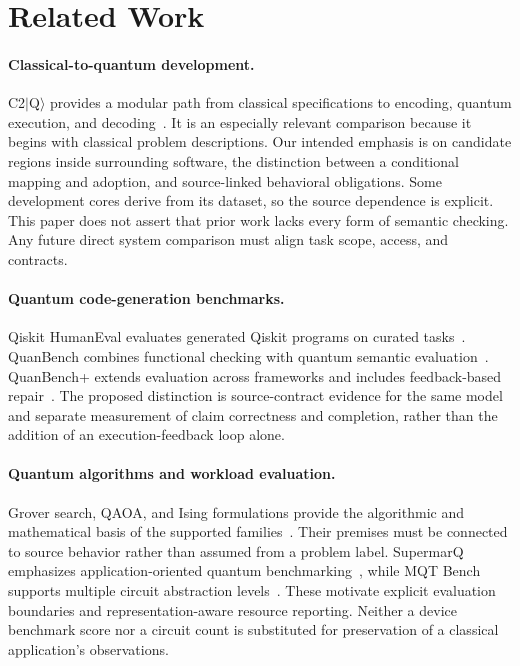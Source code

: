 \section{Related Work}
\paragraph{Classical-to-quantum development.}
C2$|$Q$\rangle$ provides a modular path from classical specifications to encoding,
quantum execution, and decoding~\cite{c2q}. It is an especially relevant comparison
because it begins with classical problem descriptions. Our intended emphasis is
on candidate regions inside surrounding software, the distinction between a
conditional mapping and adoption, and source-linked behavioral obligations. Some
development cores derive from its dataset, so the source dependence is explicit.
This paper does not assert that prior work lacks every form of semantic checking.
Any future direct system comparison must align task scope, access, and contracts.

\paragraph{Quantum code-generation benchmarks.}
Qiskit HumanEval evaluates generated Qiskit programs on curated tasks~\cite{qhe}.
QuanBench combines functional checking with quantum semantic evaluation~\cite{quanbench}.
QuanBench+ extends evaluation across frameworks and includes feedback-based
repair~\cite{quanplus}. The proposed distinction is source-contract evidence for
the same model and separate measurement of claim correctness and completion,
rather than the addition of an execution-feedback loop alone.

\paragraph{Quantum algorithms and workload evaluation.}
Grover search, QAOA, and Ising formulations provide the algorithmic and mathematical
basis of the supported families~\cite{grover,qaoa,lucas}. Their premises must be
connected to source behavior rather than assumed from a problem label.
SupermarQ emphasizes application-oriented quantum benchmarking~\cite{supermarq},
while MQT Bench supports multiple circuit abstraction levels~\cite{mqt}.
These motivate explicit evaluation boundaries and representation-aware resource
reporting. Neither a device benchmark score nor a circuit count is substituted
for preservation of a classical application's observations.

